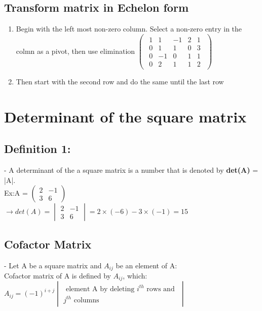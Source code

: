\documentclass[12pt]{article}
\begin{document}
\subsection{Transform matrix in Echelon form}
\begin{enumerate}
	\item Begin with the left most non-zero column. Select a non-zero entry in the colmn as a pivot, then use elimination
	$\begin{pmatrix}
	\begin{array}{rrrr|r}
	1 & 1 & -1 & 2 & 1 \\
	0 & 1 & 1 & 0 & 3 \\
	0 & -1 & 0 & 1 & 1 \\
	0 & 2 & 1 & 1 & 2
	\end{array}
	\end{pmatrix}$
	\item Then start with the second row and do the same until the last row 
\end{enumerate}
\section{Determinant of the square matrix}
\subsection{Definition 1:}
- A determinant of the a square matrix is a number that is denoted by \textbf{det(A)} = |A|.\\
Ex:A = 
$\begin{pmatrix}
2 & -1 \\
3 & 6
\end{pmatrix}$
\\
$\rightarrow det(A) = 
\begin{vmatrix}
2 & -1 \\
3 & 6
\end{vmatrix} = 2 \times (-6) - 3 \times (-1) = 15$ \\
\subsection{Cofactor Matrix}
- Let A be a square matrix and $A_{ij}$ be an element of A: \\
Cofactor matrix of A is defined by $A_{ij}$, which: \\
$A_{ij} = (-1)^{i+j} 
\begin{vmatrix}
\mbox{ element A by deleting } i^{th} \mbox{ rows and } \\ 
j^{th} \mbox{ columns }
\end{vmatrix}$
\end{document}
